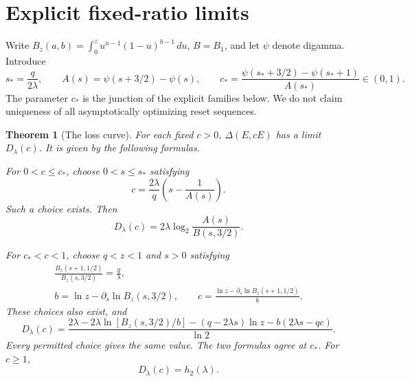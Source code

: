 \documentclass[11pt]{article}
\newtheorem{theorem}{Theorem}[section]
\newcommand{\hbin}{h_2}
\begin{document}
\section{Explicit fixed-ratio limits}
Write $B_z(a,b)=\int_0^zu^{a-1}(1-u)^{b-1}\,du$, $B=B_1$, and let $\psi$ denote digamma. Introduce
\begin{equation}\label{eq:junction}
 s_* =\frac q{2\lambda},\qquad A(s)=\psi(s+3/2)-\psi(s),\qquad
 c_* =\frac{\psi(s_*+3/2)-\psi(s_*+1)}{A(s_*)}\in(0,1).
\end{equation}
The parameter $c_*$ is the junction of the explicit families below. We do not claim uniqueness of all asymptotically optimizing reset sequences.

\begin{theorem}[The loss curve]\label{thm:curve}
For each fixed $c>0$, $\Delta(E,cE)$ has a limit $D_\lambda(c)$. It is given by the following formulas.

For $0<c\le c_*$, choose $0<s\le s_*$ satisfying
\begin{equation}\label{eq:atom-parameter}
 c=\frac{2\lambda}{q}\left(s-\frac1{A(s)}\right).
\end{equation}
Such a choice exists. Then
\begin{equation}\label{eq:atom-value}
 D_\lambda(c)=2\lambda\log_2\frac{A(s)}{B(s,3/2)}.
\end{equation}

For $c_*<c<1$, choose $q<z<1$ and $s>0$ satisfying
\begin{gather}
 \frac{B_z(s+1,1/2)}{B_z(s,3/2)}=\frac q\lambda,\label{eq:ratio}\\
 b=\ln z-\partial_s\ln B_z(s,3/2),\qquad
 c=\frac{\ln z-\partial_s\ln B_z(s+1,1/2)}b.\label{eq:diffuse-parameter}
\end{gather}
These choices also exist, and
\begin{equation}\label{eq:diffuse-value}
 D_\lambda(c)=\frac{2\lambda-2\lambda\ln[B_z(s,3/2)/b]
       -(q-2\lambda s)\ln z-b(2\lambda s-qc)}{\ln2}.
\end{equation}
Every permitted choice gives the same value. The two formulas agree at $c_*$. For $c\ge1$,
\begin{equation}\label{eq:plateau}
 D_\lambda(c)=\hbin(\lambda).
\end{equation}
\end{theorem}
\end{document}
